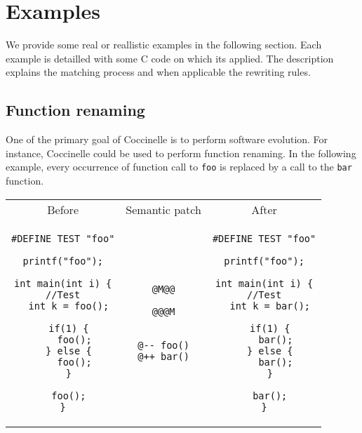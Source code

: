 
\section{Examples}

We provide some real or reallistic examples in the following section.
Each example is detailled with some C code on which its applied. The
description explains the matching process and when applicable the
rewriting rules.

\subsection{Function renaming}

One of the primary goal of Coccinelle is to perform software
evolution.  For instance, Coccinelle could be used to perform function
renaming. In the following example, every occurrence of function call
to \texttt{foo} is replaced by a call to the \texttt{bar} function.

\begin{tabular}{ccc}
Before & Semantic patch & After \\
\begin{minipage}[t]{.3\linewidth}
\begin{lstlisting}
#DEFINE TEST "foo"

printf("foo");

int main(int i) {
//Test
  int k = foo();

  if(1) {
    foo();
  } else {
    foo();
  }

  foo();
}
\end{lstlisting}
\end{minipage}
&
\begin{minipage}[t]{.3\linewidth}
\begin{lstlisting}[language=Cocci]
@M@@

@@@M


@-- foo()
@++ bar()
\end{lstlisting}
\end{minipage}
&
\begin{minipage}[t]{.3\linewidth}
\begin{lstlisting}
#DEFINE TEST "foo"

printf("foo");

int main(int i) {
//Test
  int k = bar();

  if(1) {
    bar();
  } else {
    bar();
  }

  bar();
}
\end{lstlisting}
\end{minipage}\\
\end{tabular}

